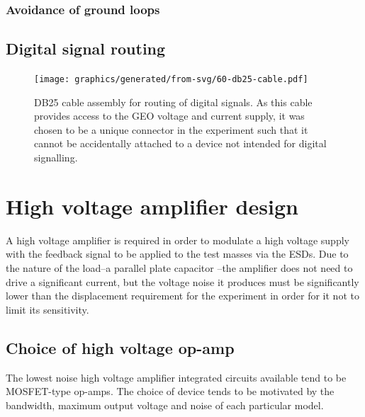 
\subsubsection{Avoidance of ground loops}

\subsection{Digital signal routing}

\begin{figure}
  \centering
  \texttt{[image: graphics/generated/from-svg/60-db25-cable.pdf]}
  \caption[DB25 cable assembly]{DB25 cable assembly for routing of digital signals. As this cable provides access to the GEO voltage and current supply, it was chosen to be a unique connector in the experiment such that it cannot be accidentally attached to a device not intended for digital signalling.}
  \label{fig:db25-cable}
\end{figure}

\section{\label{sec:hv-amplifier}High voltage amplifier design}
A high voltage amplifier is required in order to modulate a high voltage supply with the feedback signal to be applied to the test masses via the \glspl{ESD}. Due to the nature of the load--a parallel plate capacitor --the amplifier does not need to drive a significant current, but the voltage noise it produces must be significantly lower than the displacement requirement for the experiment in order for it not to limit its sensitivity.

\subsection{Choice of high voltage op-amp}
The lowest noise high voltage amplifier integrated circuits available tend to be \gls{MOSFET}-type op-amps. The choice of device tends to be motivated by the bandwidth, maximum output voltage and noise of each particular model.

